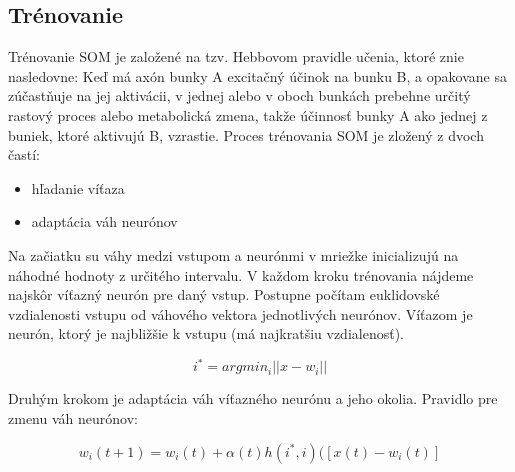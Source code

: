 \subsection{Trénovanie}
Trénovanie SOM je založené na tzv. Hebbovom pravidle učenia, ktoré znie nasledovne:
Keď má axón bunky A excitačný účinok na bunku B, a opakovane sa zúčastňuje na jej aktivácii, v jednej
alebo v oboch bunkách prebehne určitý rastový proces alebo metabolická zmena, takže účinnosť bunky A ako jednej z buniek, ktoré aktivujú B, vzrastie.
Proces trénovania SOM je zložený z dvoch častí:
\begin{itemize}
\item hľadanie víťaza
\item adaptácia váh neurónov
\end{itemize}
Na začiatku su váhy medzi vstupom a neurónmi v mriežke inicializujú na náhodné hodnoty z určitého intervalu.
V každom kroku trénovania nájdeme najskôr víťazný neurón pre daný vstup. Postupne počítam euklidovské vzdialenosti vstupu od váhového vektora jednotlivých neurónov. Víťazom je neurón, ktorý je najbližšie k vstupu (má najkratšiu vzdialenosť).

\begin{equation}
i^* = argmin_i||x-w_i|| 
\end{equation}

Druhým krokom je adaptácia váh víťazného neurónu a jeho okolia. Pravidlo pre zmenu váh neurónov:

\begin{equation}
w_i(t+1) = w_i(t) + \alpha(t)h(i^*, i)([x(t) - w_i(t)]
\end{equation}

